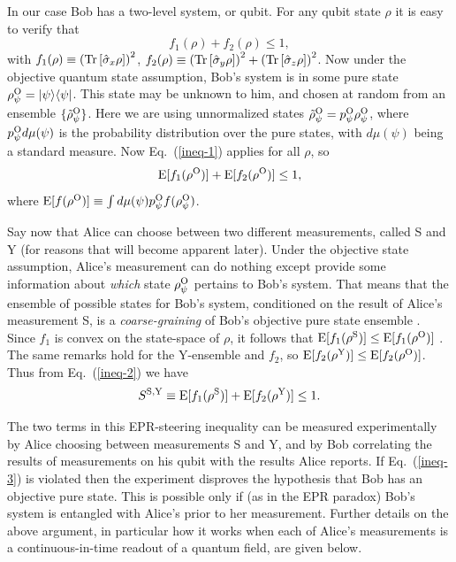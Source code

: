 \documentclass[12pt,prl,floatfix,showpacs,superscriptaddress,amsmath,amssymb]{revtex4}
\newcommand{\beq}{\begin{equation}}
\newcommand{\eeq}{\end{equation}}
\newcommand{\erf}[1]{Eq.~(\ref{#1})}
\newcommand{\bra}[1]{\langle{#1}|}
\newcommand{\ket}[1]{|{#1}\rangle}
\renewcommand{\(}{\left(}
\renewcommand{\)}{\right)}
\newcommand{\sq}[1]{\left[ {#1} \right]}
\newcommand{\ro}[1]{\left( {#1} \right)}
\newcommand{\tr}[1]{{\rm Tr}\sq{ {#1} }}
\renewcommand{\d}{^{\rm Y}}
\newcommand{\p}{^{\rm S}}
\newcommand{\ob}{^{\rm O}}
\newcommand{\s}[1]{\hat \sigma_{#1}}
\begin{document}
In our case Bob has a two-level system, or qubit. For any qubit state $\rho$ it is easy to verify that 
\beq
f_1(\rho) + f_2(\rho) \leq 1,
\label{ineq-1}
 \eeq 
with $
f_1(\rho) \equiv \ro{ \tr{\s{x}\rho} }^2$, $ f_2(\rho) \equiv
 \ro{ \tr{\s{y}\rho} }^2+ \ro{ \tr{\s{z}\rho} }^2$. 
Now under the objective quantum state assumption, Bob's system is in some pure state 
$\rho\ob_\psi = \ket{\psi}\bra{\psi}$. This state may be unknown to him, and chosen at 
random from an ensemble $\{\tilde\rho\ob_\psi \}$.  Here we are using unnormalized 
states $\tilde\rho\ob_\psi = p\ob_\psi \rho\ob_\psi$, where 
$p\ob_\psi d\mu(\psi)$ is the probability distribution over the pure states, with 
$d\mu(\psi)$ being a standard measure.  Now \erf{ineq-1} applies 
for all $\rho$, so  
\beq \label{ineq-2}
 {\rm E}[f_1(\rho\ob)] + {\rm E}[f_2(\rho\ob)] \leq 1,
\eeq
where $ {\rm E}[f(\rho\ob)]  \equiv  \int d\mu(\psi)  p\ob_\psi f(\rho\ob_\psi)$.

Say now that Alice can choose between two different measurements, called S and Y (for reasons that will become apparent later). 
Under the objective state assumption, Alice's measurement can do nothing except provide some information
about {\em which} state $\rho\ob_\psi$ pertains to Bob's system. That means that 
the ensemble of possible states for Bob's system, conditioned on the result of Alice's measurement S,
 is a {\em coarse-graining} of Bob's objective pure state ensemble \cite{JonWisDoh07}. Since $f_1$ is 
 convex on the state-space of $\rho$, it follows that ${\rm E}[f_1(\rho\p)] \leq {\rm E}[f_1(\rho\ob)]$ \cite{CavJonWisRei09}. 
 The same remarks hold for the Y-ensemble and $f_2$, so ${\rm E}[f_2(\rho\d)] \leq {\rm E}[f_2(\rho\ob)]$. Thus from \erf{ineq-2} we  have 
\beq \label{ineq-3}
S^{\rm S,Y} \equiv {\rm E}[f_1(\rho\p)] + {\rm E}[f_2(\rho\d)] \leq 1.
\eeq

The two terms in this EPR-steering inequality can be measured experimentally by Alice choosing between 
measurements S and Y, and by Bob correlating the results of measurements on his qubit  
with the results Alice reports. If \erf{ineq-3} is violated 
 then the experiment disproves the hypothesis that Bob has an objective pure state. 
This is possible only if (as in the EPR paradox) Bob's system is entangled with Alice's prior to her measurement.  
Further details on the above argument, in particular how it works when each of Alice's measurements is 
a continuous-in-time readout of a quantum field, are given below.
\end{document}
